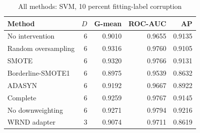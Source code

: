 \begin{table}[htbp]
\caption{All methods: SVM, 10 percent fitting-label corruption}
\centering\small
\begin{tabular}{lrrrr}
\hline
Method & $D$ & G-mean & ROC-AUC & AP\\
\hline
No intervention & 6 & 0.9010 & 0.9655 & 0.9135 \\
Random oversampling & 6 & 0.9316 & 0.9760 & 0.9105 \\
SMOTE & 6 & 0.9320 & 0.9766 & 0.9131 \\
Borderline-SMOTE1 & 6 & 0.8975 & 0.9539 & 0.8632 \\
ADASYN & 6 & 0.9192 & 0.9667 & 0.8922 \\
Complete & 6 & 0.9259 & 0.9767 & 0.9145 \\
No downweighting & 6 & 0.9271 & 0.9794 & 0.9216 \\
WRND adapter & 3 & 0.9074 & 0.9711 & 0.8619 \\
\hline
\end{tabular}
\end{table}
\clearpage
